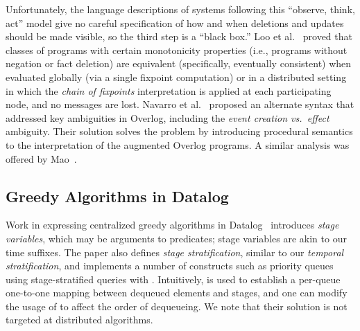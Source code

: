 Unfortunately, the language descriptions of systems following this ``observe, think, act'' model
give no careful specification of how and when deletions and updates
should be made visible, so the third step is a ``black box.''  Loo et al.~\cite{loo-sigmod06} proved that classes of programs with certain 
monotonicity properties (i.e., programs without negation or fact deletion)
are equivalent (specifically, eventually consistent) when evaluated globally (via a single fixpoint computation) or in a distributed setting in which the 
\emph{chain of fixpoints} interpretation is applied at each participating node, and no messages are lost.
Navarro et al.~\cite{navarro} proposed an alternate syntax that addressed key ambiguities in Overlog, including the
\emph{event creation vs.\ effect} ambiguity.  Their solution solves the problem by introducing procedural semantics to the interpretation of 
the augmented Overlog programs.  A similar analysis was offered by Mao~\cite{Mao2009}.

\subsection{Greedy Algorithms in Datalog}

Work in expressing centralized greedy algorithms in
Datalog~\cite{greedybychoice} introduces {\em stage variables}, which may be
arguments to predicates; stage variables are akin to our time suffixes.  The
paper also defines {\em stage stratification}, similar to our {\em temporal
stratification}, and implements a number of constructs such as priority queues
using stage-stratified queries with .  Intuitively,
 is used to establish a per-queue one-to-one mapping between
dequeued elements and stages, and one can modify the usage of 
to affect the order of dequeueing.  We note that their solution is not targeted
at distributed algorithms.


